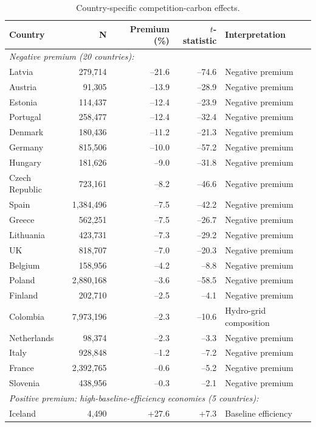\documentclass[11pt]{article}
\begin{document}
\begin{table}[H]
\centering
\small
\caption{Country-specific competition-carbon effects.}
\label{tab:country}
\begin{tabular}{lrrrl}
\toprule
\textbf{Country} & \textbf{N} & \textbf{Premium (\%)} & \textbf{$t$-statistic} & \textbf{Interpretation} \\
\midrule
\multicolumn{5}{l}{\textit{Negative premium (20 countries):}} \\
Latvia & 279,714 & --21.6 & --74.6 & Negative premium \\
Austria & 91,305 & --13.9 & --28.9 & Negative premium \\
Estonia & 114,437 & --12.4 & --23.9 & Negative premium \\
Portugal & 258,477 & --12.4 & --32.4 & Negative premium \\
Denmark & 180,436 & --11.2 & --21.3 & Negative premium \\
Germany & 815,506 & --10.0 & --57.2 & Negative premium \\
Hungary & 181,626 & --9.0 & --31.8 & Negative premium \\
Czech Republic & 723,161 & --8.2 & --46.6 & Negative premium \\
Spain & 1,384,496 & --7.5 & --42.2 & Negative premium \\
Greece & 562,251 & --7.5 & --26.7 & Negative premium \\
Lithuania & 423,731 & --7.3 & --29.2 & Negative premium \\
UK & 818,707 & --7.0 & --20.3 & Negative premium \\
Belgium & 158,956 & --4.2 & --8.8 & Negative premium \\
Poland & 2,880,168 & --3.6 & --58.5 & Negative premium \\
Finland & 202,710 & --2.5 & --4.1 & Negative premium \\
Colombia & 7,973,196 & --2.3 & --10.6 & Hydro-grid composition \\
Netherlands & 98,374 & --2.3 & --3.3 & Negative premium \\
Italy & 928,848 & --1.2 & --7.2 & Negative premium \\
France & 2,392,765 & --0.6 & --5.2 & Negative premium \\
Slovenia & 438,956 & --0.3 & --2.1 & Negative premium \\
\midrule
\multicolumn{5}{l}{\textit{Positive premium: high-baseline-efficiency economies (5 countries):}} \\
Iceland & 4,490 & +27.6 & +7.3 & Baseline efficiency \\

\end{tabular}
\end{table}
\end{document}
